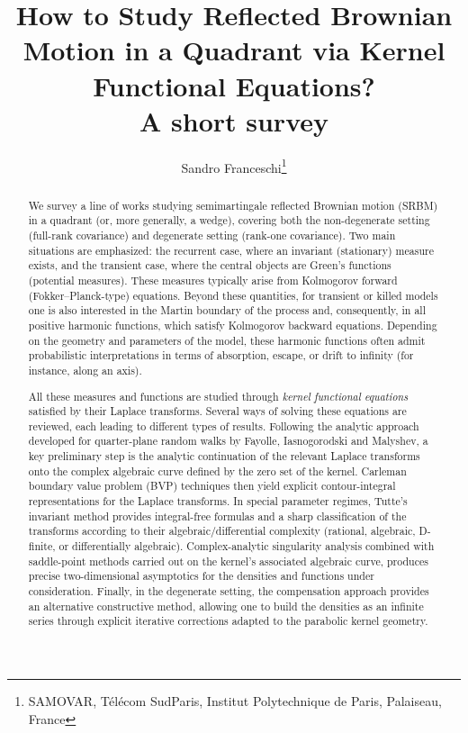 \documentclass[11pt]{article}
\title{How to Study Reflected Brownian Motion in a Quadrant via Kernel Functional Equations?\\
\medskip
\large A short survey}
\author{Sandro Franceschi\thanks{SAMOVAR, Télécom SudParis, Institut Polytechnique de Paris, Palaiseau, France}}
\date{}
\theoremstyle{definition}
\begin{document}
\maketitle


\begin{abstract}
We survey a line of works studying semimartingale reflected Brownian motion (SRBM) in a quadrant (or, more generally, a wedge), covering both the non-degenerate setting (full-rank covariance) and degenerate setting (rank-one covariance).
Two main situations are emphasized: the recurrent case, where an invariant (stationary) measure exists, and the transient case, where the central objects are Green’s functions (potential measures). These measures typically arise from Kolmogorov forward (Fokker–Planck-type) equations. 
Beyond these quantities, for transient or killed models one is also interested in the Martin boundary of the process and, consequently, in all positive harmonic functions, which satisfy Kolmogorov backward equations. Depending on the geometry and parameters of the model, these harmonic functions often admit probabilistic interpretations in terms of absorption, escape, or drift to infinity (for instance, along an axis). 

All these measures and functions are studied through \emph{kernel functional equations} satisfied by their Laplace transforms. 
Several ways of solving these equations are reviewed, each leading to different types of results. Following the analytic approach developed for quarter-plane random walks by Fayolle, Iasnogorodski and Malyshev, a key preliminary step is the analytic continuation of the relevant Laplace transforms onto the complex algebraic curve defined by the zero set of the kernel. Carleman boundary value problem (BVP) techniques then yield explicit contour-integral representations for the Laplace transforms. In special parameter regimes, Tutte’s invariant method provides integral-free formulas and a sharp classification of the transforms according to their algebraic/differential complexity (rational, algebraic, D-finite, or differentially algebraic). Complex-analytic singularity analysis combined with saddle-point methods carried out on the kernel’s associated algebraic curve, produces precise two-dimensional asymptotics for the densities and functions under consideration. Finally, in the degenerate setting, the compensation approach provides an alternative constructive method, allowing one to build the densities as an infinite series through explicit iterative corrections adapted to the parabolic kernel geometry.
\end{abstract}
\end{document}
